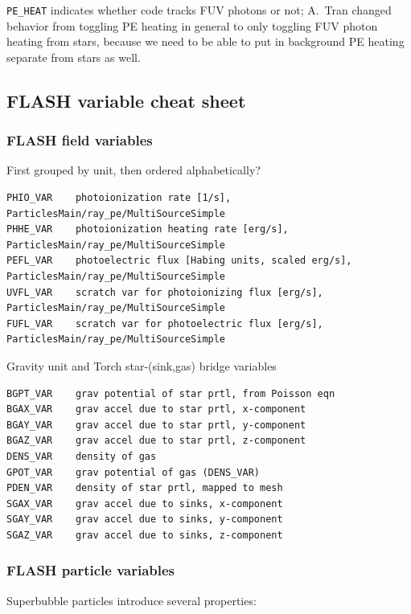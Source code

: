 \documentclass[10pt]{article}
\begin{document}
\texttt{PE\_HEAT} indicates whether code tracks FUV photons or not; A.~Tran
changed behavior from toggling PE heating in general to only toggling FUV
photon heating from stars, because we need to be able to put in background PE
heating separate from stars as well.


\subsection{FLASH variable cheat sheet}

\subsubsection{FLASH field variables}

First grouped by unit, then ordered alphabetically?

\begin{verbatim}
PHIO_VAR    photoionization rate [1/s],                      ParticlesMain/ray_pe/MultiSourceSimple
PHHE_VAR    photoionization heating rate [erg/s],            ParticlesMain/ray_pe/MultiSourceSimple
PEFL_VAR    photoelectric flux [Habing units, scaled erg/s], ParticlesMain/ray_pe/MultiSourceSimple
UVFL_VAR    scratch var for photoionizing flux [erg/s],      ParticlesMain/ray_pe/MultiSourceSimple
FUFL_VAR    scratch var for photoelectric flux [erg/s],      ParticlesMain/ray_pe/MultiSourceSimple
\end{verbatim}

Gravity unit and Torch star-(sink,gas) bridge variables

\begin{verbatim}
BGPT_VAR    grav potential of star prtl, from Poisson eqn
BGAX_VAR    grav accel due to star prtl, x-component
BGAY_VAR    grav accel due to star prtl, y-component
BGAZ_VAR    grav accel due to star prtl, z-component
DENS_VAR    density of gas
GPOT_VAR    grav potential of gas (DENS_VAR)
PDEN_VAR    density of star prtl, mapped to mesh
SGAX_VAR    grav accel due to sinks, x-component
SGAY_VAR    grav accel due to sinks, y-component
SGAZ_VAR    grav accel due to sinks, z-component
\end{verbatim}

\subsubsection{FLASH particle variables}

Superbubble particles introduce several properties:
\end{document}
